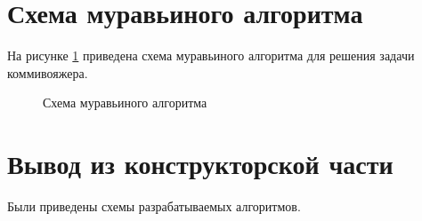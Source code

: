 \clearpage
\section{Схема муравьиного алгоритма}

На рисунке \ref{fig:ant_search} приведена схема муравьиного алгоритма для решения задачи коммивояжера.

\begin{figure}[h!]
	
	
	\caption{Схема муравьиного алгоритма}
	
	\label{fig:ant_search}
	
\end{figure}


\clearpage
\section{Вывод из конструкторской части}

Были приведены схемы разрабатываемых алгоритмов.


